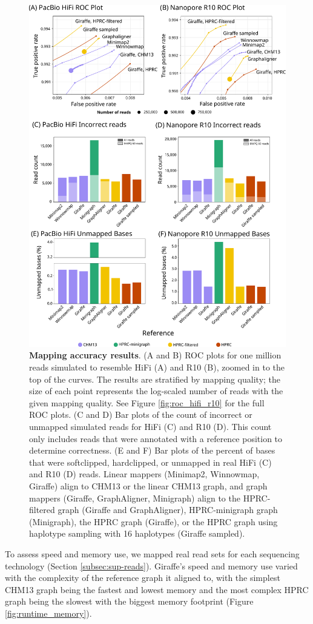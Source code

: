 \documentclass[11pt]{ucscthesis}
\begin{document}
\begin{figure}[htb]
    \centering
    \includegraphics[width=.75\columnwidth]{lr_mapping_accuracy.pdf}
    \caption[Long read mapping accuracy]{\textbf{Mapping accuracy results}. 
    (A and B) ROC plots for one million reads simulated to resemble HiFi (A) and R10 (B), zoomed in to the top of the curves. 
    The results are stratified by mapping quality; the size of each point represents the log-scaled number of reads with the given mapping quality. 
    See Figure \ref{fig:roc_hifi_r10} for the full ROC plots. 
    (C and D) Bar plots of the count of incorrect or unmapped simulated reads for HiFi (C) and R10 (D). 
    This count only includes reads that were annotated with a reference position to determine correctness. 
    (E and F) Bar plots of the percent of bases that were softclipped, hardclipped, or unmapped in real HiFi (C) and R10 (D) reads.
    Linear mappers (Minimap2, Winnowmap, Giraffe) align to CHM13 or the linear CHM13 graph, and graph mappers (Giraffe, GraphAligner, Minigraph) align to the HPRC-filtered graph (Giraffe and GraphAligner), HPRC-minigraph graph (Minigraph), the HPRC graph (Giraffe), or the HPRC graph using haplotype sampling with 16 haplotypes (Giraffe sampled).}
    \label{fig:mapping_accuracy}
\end{figure}


To assess speed and memory use, we mapped real read sets for each sequencing technology (Section \ref{subsec:sup-reads}).
Giraffe's speed and memory use varied with the complexity of the reference graph it aligned to, with the simplest CHM13 graph being the fastest and lowest memory and the most complex HPRC graph being the slowest with the biggest memory footprint (Figure \ref{fig:runtime_memory}).
\end{document}
